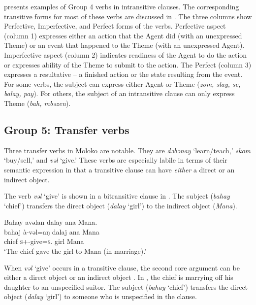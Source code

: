 \largerpage
{} presents examples of Group 4 verbs in intransitive clauses. The corresponding transitive forms for most of these verbs are discussed in . The three columns show Perfective, Imperfective, and Perfect forms of the verbs. Perfective aspect (column 1) expresses either an action that the Agent did (with an unexpressed Theme) or an event that happened to the Theme (with an unexpressed Agent). Imperfective aspect (column 2) indicates readiness of the Agent to do the action or expresses ability of the Theme to submit to the action. The Perfect (column 3) expresses a resultative -- a finished action or the state resulting from the event. For some verbs, the subject can express either Agent or Theme (\textit{zom, slay, se, balay, pay}). For others, the subject of an intransitive clause can only express Theme (\textit{bah, mbəzen}).


\subsection{Group 5: Transfer verbs}\label{sec:9.2.5}
\hypertarget{RefHeading1212741525720847}{}
Three transfer verbs in Moloko are notable. They are \textit{dəbənay} ‘learn/teach,’ \textit{skom} ‘buy/sell,’ and \textit{vəl}  ‘give.’ These verbs are especially labile in terms of their semantic expression in that a transitive clause can have \textit{either} a direct or an indirect object. 

The verb \textit{vəl}  ‘give’ is shown in a bitransitive clause in . The subject (\textit{bahay} ‘chief’) transfers the direct object (\textit{dalay}  ‘girl’) to the indirect object (\textit{Mana}).

\ea \label{ex:9:33}
Bahay  avəlan  dalay  ana  Mana.\\
\gll  bahaj   à-vəl=aŋ     dalaj   ana   Mana\\
      chief  \textsc{s}+{\PFV}-give=\textsc{s}.{\IO}  girl  {\DAT} Mana\\
\glt  ‘The chief gave the girl to Mana (in marriage).’ 
\z

When \textit{vəl}  ‘give’ occurs in a transitive clause, the second core argument can be either a direct object  or an indirect object .  In , the chief is marrying off his daughter to an unspecified suitor. The subject (\textit{bahay}  ‘chief’) transfers the direct object (\textit{dalay}  ‘girl’) to someone who is unspecified in the clause. 

